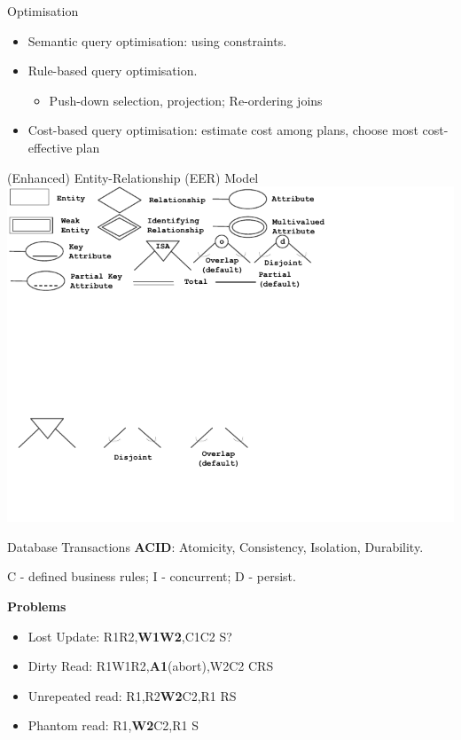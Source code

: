 \documentclass[a4paper]{article}
\begin{document}
\begin{multicols}{3}
\begin{cheatsheetblock} {Optimisation}
    \begin{itemize}
        \item Semantic query optimisation: using constraints.
        \item Rule-based query optimisation.
              \begin{itemize}
                  \item Push-down selection, projection; Re-ordering joins
              \end{itemize}
        \item Cost-based query optimisation: estimate cost among plans, choose most cost-effective plan
    \end{itemize}
\end{cheatsheetblock}

\begin{cheatsheetblock}{(Enhanced) Entity-Relationship (EER) Model}
    \includegraphics[width=\linewidth, page=1]{pic/EER.pdf}
\end{cheatsheetblock}

\begin{cheatsheetblock}{Database Transactions}
    \textbf{ACID}: Atomicity, Consistency, Isolation, Durability.

    C - defined business rules; I - concurrent; D - persist.

    \textbf{Problems}
    \begin{itemize}
        \item Lost Update: R1R2,\textbf{W1W2},C1C2 \hfill S?
        \item Dirty Read: R1W1R2,\textbf{A1}(abort),W2C2 \hfill CRS
        \item Unrepeated read: R1,R2\textbf{W2}C2,R1 \hfill RS
        \item Phantom read: R1,\textbf{W2}C2,R1 \hfill S
    \end{itemize}
    

\end{cheatsheetblock}
\end{multicols}
\end{document}
